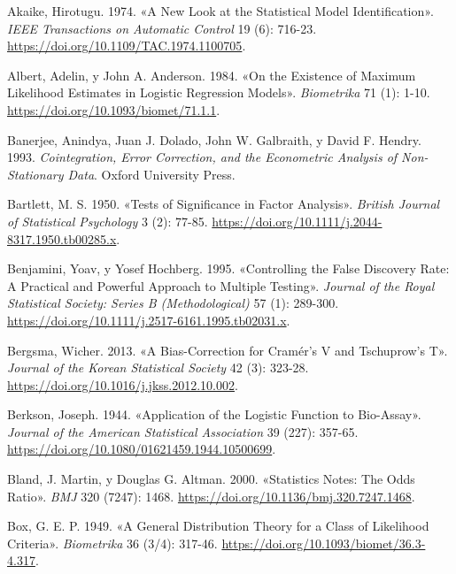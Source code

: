 \documentclass[
  spanish,
  letterpaper,
  DIV=11,
  numbers=noendperiod]{scrartcl}
\newlength{\cslhangindent}
\newenvironment{CSLReferences}[2] %
 {\begin{list}{}{%
  \setlength{\itemindent}{0pt}
  \setlength{\leftmargin}{0pt}
  \setlength{\parsep}{0pt}
  \ifodd #1
   \setlength{\leftmargin}{\cslhangindent}
   \setlength{\itemindent}{-1\cslhangindent}
  \fi
  \setlength{\itemsep}{#2\baselineskip}}}
 {\end{list}}
\begin{document}
\begingroup
\hypersetup{urlcolor=asesoriaLinkColor}

\protect{}\label{refs}
\begin{CSLReferences}{1}{1}
Akaike, Hirotugu. 1974. {«A New Look at the Statistical Model
Identification»}. \emph{IEEE Transactions on Automatic Control} 19 (6):
716-23. \url{https://doi.org/10.1109/TAC.1974.1100705}.

Albert, Adelin, y John A. Anderson. 1984. {«On the Existence of Maximum
Likelihood Estimates in Logistic Regression Models»}. \emph{Biometrika}
71 (1): 1-10. \url{https://doi.org/10.1093/biomet/71.1.1}.

Banerjee, Anindya, Juan J. Dolado, John W. Galbraith, y David F. Hendry.
1993. \emph{Cointegration, Error Correction, and the Econometric
Analysis of Non-Stationary Data}. Oxford University Press.

Bartlett, M. S. 1950. {«Tests of Significance in Factor Analysis»}.
\emph{British Journal of Statistical Psychology} 3 (2): 77-85.
\url{https://doi.org/10.1111/j.2044-8317.1950.tb00285.x}.

Benjamini, Yoav, y Yosef Hochberg. 1995. {«Controlling the False
Discovery Rate: A Practical and Powerful Approach to Multiple Testing»}.
\emph{Journal of the Royal Statistical Society: Series B
(Methodological)} 57 (1): 289-300.
\url{https://doi.org/10.1111/j.2517-6161.1995.tb02031.x}.

Bergsma, Wicher. 2013. {«A Bias-Correction for Cramér's V and
Tschuprow's T»}. \emph{Journal of the Korean Statistical Society} 42
(3): 323-28. \url{https://doi.org/10.1016/j.jkss.2012.10.002}.

Berkson, Joseph. 1944. {«Application of the Logistic Function to
Bio-Assay»}. \emph{Journal of the American Statistical Association} 39
(227): 357-65. \url{https://doi.org/10.1080/01621459.1944.10500699}.

Bland, J. Martin, y Douglas G. Altman. 2000. {«Statistics Notes: The
Odds Ratio»}. \emph{BMJ} 320 (7247): 1468.
\url{https://doi.org/10.1136/bmj.320.7247.1468}.

Box, G. E. P. 1949. {«A General Distribution Theory for a Class of
Likelihood Criteria»}. \emph{Biometrika} 36 (3/4): 317-46.
\url{https://doi.org/10.1093/biomet/36.3-4.317}.


\end{CSLReferences}
\end{document}
